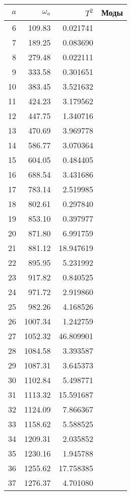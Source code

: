 \tiny
\begin{tabular}{r|rr|l}
  \toprule
  $a$ &  $\omega_a$ & $T^2$ & Моды
  \\
  \midrule
  6  &  109.83  &  0.021741  & \\
  7  &  189.25  &  0.083690  & \\
  8  &  279.48  &  0.022111  & \\
  9  &  333.58  &  0.301651  & \\
  10 &  383.45  &  3.521632  & \\
  11 &  424.23  &  3.179562  & \\
  12 &  447.75  &  1.340716  & \\
  13 &  470.69  &  3.969778  & \\
  14 &  586.77  &  3.070364  & \\
  15 &  604.05  &  0.484405  & \\
  16 &  688.54  &  3.431686  & \\
  17 &  783.14  &  2.519985  & \\
  18 &  802.61  &  0.297840  & \\
  19 &      853.10  &  0.397977  & \\
  20 &      871.80  &  6.991759  & \\
  21 &      881.12  & 18.947619  & \\
  22 &      895.95  &  5.231992  & \\
  23 &      917.82  &  0.840525  & \\
  24 &      971.72  &  2.919860  & \\
  25 &      982.26  &  4.168526  & \\
  26 &     1007.34  &  1.242759  & \\
  27 &     1052.32  & 46.809901  & \\
  28 &     1084.58  &  3.393587  & \\
  29 &     1087.31  &  3.645373  & \\
  30 &     1102.84  &  5.498771  & \\
  31 &     1113.32  & 15.591687  & \\
  32 &     1124.09  &  7.866367  & \\
  33 &     1158.62  &  5.588525  & \\
  34 &     1209.31  &  2.035852  & \\
  35 &     1230.16  &  1.945788  & \\
  36 &     1255.62  & 17.758385  & \\
  37 &     1276.37  &  4.701080  & \\

\end{tabular}
